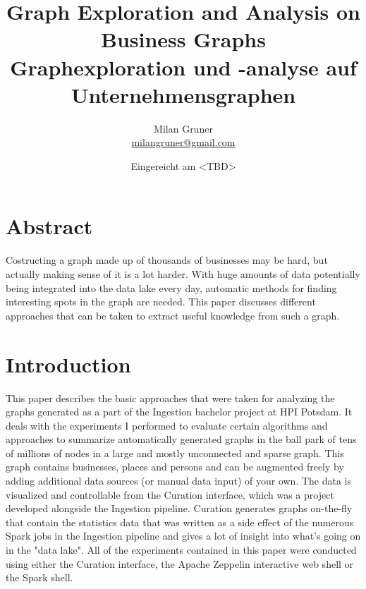 \documentclass[
        a4paper,     %
        titlepage,   %
        oneside,     %
        parskip      %
        ]{scrartcl}  %
\title{
  Graph Exploration and Analysis on Business Graphs
  \\ \bigskip
  \large{Graphexploration und -analyse auf Unternehmensgraphen}
}
\author{Milan Gruner\\{\small{\url{milangruner@gmail.com}}}}
\date{Eingereicht am <TBD>}
\begin{document}
  \maketitle    %
  \clearpage %

  \section*{Abstract}
  { \large
    Costructing a graph made up of thousands of businesses may be hard, but actually making sense of it is a lot harder.
    With huge amounts of data potentially being integrated into the data lake every day, automatic methods for finding interesting spots in the graph are needed.
    This paper discusses different approaches that can be taken to extract useful knowledge from such a graph.
  }

  \clearpage
  \tableofcontents
  \pagebreak


  \section{Introduction}
    This paper describes the basic approaches that were taken for analyzing the
    graphs generated as a part of the Ingestion bachelor project at HPI Potsdam.
    It deals with the experiments I performed to evaluate certain algorithms and approaches to summarize
    automatically generated graphs in the ball park of tens of millions of nodes in
    a large and mostly unconnected and sparse graph.
    This graph contains businesses, places and persons and can be augmented freely by adding
    additional data sources (or manual data input) of your own. The data is visualized and controllable from the
    Curation interface, which was a project developed alongside the Ingestion pipeline.
    Curation generates graphs on-the-fly that contain the statistics data that was written
    as a side effect of the numerous Spark jobs in the Ingestion pipeline and gives
    a lot of insight into what's going on in the "data lake".
    All of the experiments contained in this paper were conducted using either
    the Curation interface, the Apache Zeppelin interactive web shell or the Spark shell.
\end{document}
